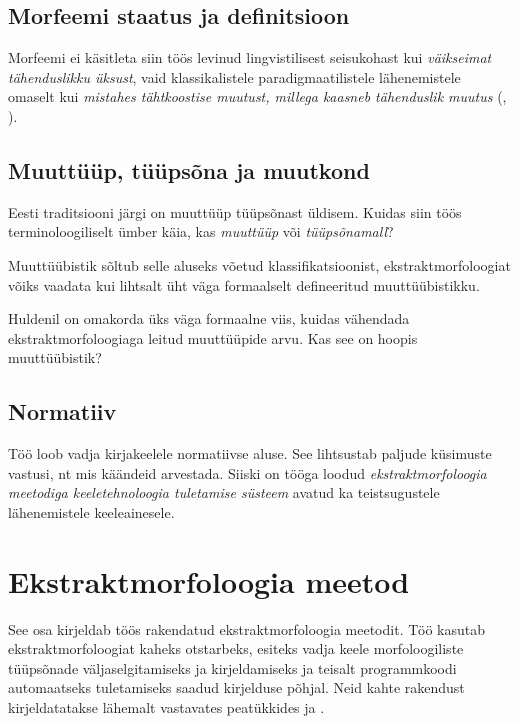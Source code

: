 \documentclass[12pt,a4paper]{article}
\begin{document}
\subsection{Morfeemi staatus ja definitsioon}
Morfeemi ei käsitleta siin töös levinud lingvistilisest seisukohast kui \textit{väikseimat tähenduslikku üksust}, vaid klassikalistele paradigmaatilistele lähenemistele omaselt kui \textit{mistahes tähtkoostise muutust, millega kaasneb tähenduslik muutus} (\cite{beard_morpheme_1987}, \cite{beard_lexeme-morpheme_1995}).

\subsection{Muuttüüp, tüüpsõna ja muutkond}
Eesti traditsiooni järgi on muuttüüp tüüpsõnast üldisem. Kuidas siin töös terminoloogiliselt ümber käia, kas \textit{muuttüüp} või \textit{tüüpsõna\-mall}?

Muuttüübistik sõltub selle aluseks võetud klassifikatsioonist, ekstrakt\-morfoloogiat võiks vaadata kui lihtsalt üht väga formaalselt defineeritud muuttüübistikku.

Huldenil on omakorda üks väga formaalne viis, kuidas vähendada ekstrakt\-morfoloogiaga leitud muuttüüpide arvu. Kas see on hoopis muuttüübistik?

\subsection{Normatiiv}
\label{sec:normatiiv}

Töö loob vadja kirjakeelele normatiivse aluse. See lihtsustab paljude küsimuste vastusi, nt mis käändeid arvestada. Siiski on tööga loodud \textit{ekstrakt\-morfoloogia meetodiga keele\-tehnoloogia tuletamise süsteem} avatud ka teistsugustele lähenemistele keeleainesele.




\newpage
\section{Ekstraktmorfoloogia meetod}
\label{sec:ekstraktmorfoloogia-meetod}
See osa kirjeldab töös rakendatud ekstraktmorfoloogia meetodit. Töö kasutab ekstraktmorfoloogiat kaheks otstarbeks, esiteks vadja keele morfoloogiliste tüüpsõnade väljaselgitamiseks ja kirjeldamiseks ja teisalt programmkoodi automaatseks tuletamiseks saadud kirjelduse põhjal. Neid kahte rakendust kirjeldatatakse lähemalt vastavates peatükkides \textit{} ja \textit{}.
\end{document}
